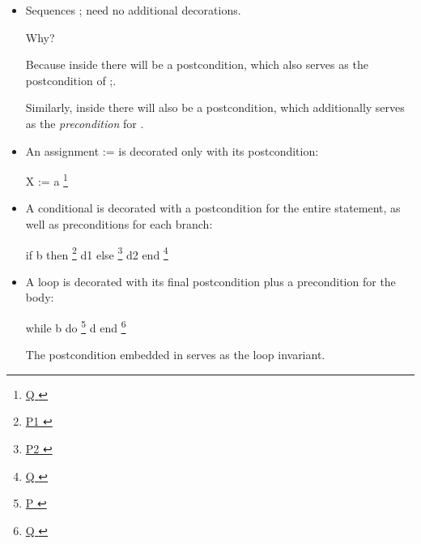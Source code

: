 \documentclass[12pt]{report}
\begin{document}
\begin{itemize}
\item  Sequences  ;  need no additional decorations.


      Why?


      Because inside  there will be a postcondition, which also
      serves as the postcondition of ;.


      Similarly, inside  there will also be a postcondition, which
      additionally serves as the \textit{precondition} for . 
\end{itemize}



\begin{itemize}
\item  An assignment  :=  is decorated only with its postcondition:


      X := a \footnote{\url{ Q }}

\end{itemize}



\begin{itemize}
\item  A conditional       is decorated with a
      postcondition for the entire statement, as well as preconditions
      for each branch:


      if b then \footnote{\url{ P1 }} d1 else \footnote{\url{ P2 }} d2 end \footnote{\url{ Q }}

\end{itemize}



\begin{itemize}
\item  A loop      is decorated with its final
      postcondition plus a precondition for the body:


      while b do \footnote{\url{ P }} d end \footnote{\url{ Q }}


      The postcondition embedded in  serves as the loop invariant. 
\end{itemize}
\end{document}
